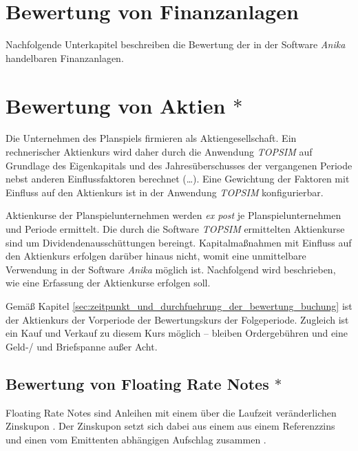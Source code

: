 \documentclass[12pt, a4paper]{article}
\begin{document}
\section{Bewertung von Finanzanlagen}
\label{sec:bewertung_von_finanzanlagen}

Nachfolgende Unterkapitel beschreiben die Bewertung der in der Software \textit{Anika} handelbaren Finanzanlagen.

\section{Bewertung von Aktien $\ast$}
\label{sec:bewertung_von_aktien}
Die Unternehmen des Planspiels firmieren als Aktiengesellschaft.
Ein rechnerischer Aktienkurs wird daher durch die Anwendung \textit{TOPSIM} auf Grundlage des Eigenkapitals und des Jahresüberschusses der vergangenen Periode nebst anderen Einflussfaktoren berechnet (\dots). 
Eine Gewichtung der Faktoren mit Einfluss auf den Aktienkurs ist in der Anwendung \textit{TOPSIM} konfigurierbar. 

Aktienkurse der Planspielunternehmen werden \textit{ex post} je Planspielunternehmen und Periode ermittelt. Die durch die Software \textit{TOPSIM} ermittelten Aktienkurse sind um Dividendenausschüttungen bereingt. Kapitalmaßnahmen mit Einfluss auf den Aktienkurs erfolgen darüber hinaus nicht, womit eine unmittelbare Verwendung in der Software \textit{Anika} möglich ist. Nachfolgend wird beschrieben, wie eine Erfassung der Aktienkurse erfolgen soll.

Gemäß Kapitel \ref{sec:zeitpunkt_und_durchfuehrung_der_bewertung_buchung} ist der Aktienkurs der Vorperiode der Bewertungskurs der Folgeperiode.
Zugleich ist ein Kauf und Verkauf zu diesem Kurs möglich -- bleiben Ordergebühren und eine Geld-/ und Briefspanne außer Acht. 


\subsection{Bewertung von Floating Rate Notes $\ast$}
\label{sec:bewertung_von_floating_rate_notes}
Floating Rate Notes sind Anleihen mit einem über die Laufzeit veränderlichen Zinskupon \autocite[][373]{fabozzi_handbook_2005}. Der Zinskupon setzt sich dabei aus einem aus einem Referenzzins und einen vom Emittenten abhängigen Aufschlag zusammen \autocite[][374]{fabozzi_handbook_2005}.
\end{document}
